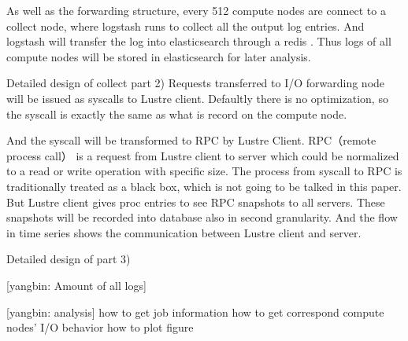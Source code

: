 \documentclass{article}
\begin{document}
As well as the forwarding structure, every 512 compute nodes are connect to a collect node, where logstash runs to collect all the output log entries. And logstash will transfer the log into elasticsearch through a redis . Thus logs of all compute nodes will be stored in elasticsearch for later analysis.

Detailed design of collect part 2)
Requests transferred to I/O forwarding node will be issued as syscalls to Lustre client. Defaultly there is no optimization, so the syscall is exactly the same as 
what is record on the compute node.

And the syscall will be transformed to RPC by Lustre Client. RPC（remote process call） is a request from Lustre client to server which could be normalized to a read or write operation with specific size. The process from syscall to RPC is traditionally treated as a black box, which is not going to be talked in this paper. But Lustre client gives proc entries to see RPC snapshots to all servers. These snapshots will be recorded into database also in second granularity. And the flow in time series shows the communication between Lustre client and server.

Detailed design of part 3)


[yangbin: Amount of all logs]

[yangbin: analysis]
how to get job information
how to get correspond compute nodes' I/O behavior
how to plot figure

\ifx\allfiles\undefined
\end{document}
